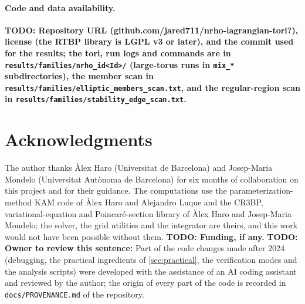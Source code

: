 \documentclass[11pt]{article}
\newcommand{\todo}[1]{\textbf{TODO: #1}}
\begin{document}
\paragraph{Code and data availability.} \todo{Repository URL (github.com/jared711/nrho-lagrangian-tori?),
license (the RTBP library is LGPL v3 or later), and the commit used for the results; the tori,
run logs and commands are in \nolinkurl{results/families/nrho_id<Id>/} (large-torus runs in
\nolinkurl{mix_*} subdirectories), the member scan in
\nolinkurl{results/families/elliptic_members_scan.txt}, and the regular-region scan in
\nolinkurl{results/families/stability_edge_scan.txt}.}

\section*{Acknowledgments}
The author thanks \`Alex Haro (Universitat de Barcelona) and Josep-Maria Mondelo (Universitat
Aut\`onoma de Barcelona) for six months of collaboration on this project and for their guidance.
The computations use the parameterization-method KAM code of \`Alex Haro and Alejandro Luque and
the CR3BP, variational-equation and Poincar\'e-section library of \`Alex Haro and Josep-Maria
Mondelo; the solver, the grid utilities and the integrator are theirs, and this work would not have
been possible without them. \todo{Funding, if any.}
\todo{Owner to review this sentence:} Part of the code changes made after 2024 (debugging, the
practical ingredients of \cref{sec:practical}, the verification modes and the analysis scripts)
were developed with the assistance of an AI coding assistant and reviewed by the author; the
origin of every part of the code is recorded in \nolinkurl{docs/PROVENANCE.md} of the repository.



\end{document}
